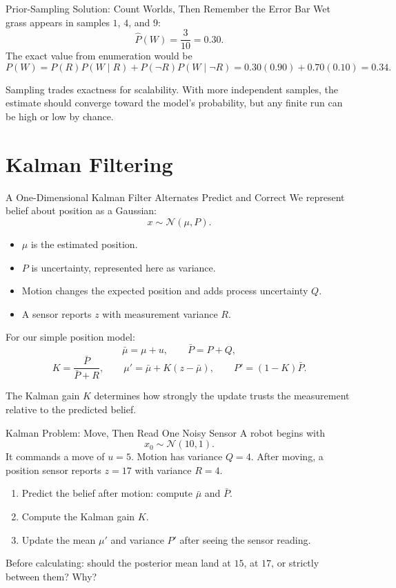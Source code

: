 \documentclass[aspectratio=169,10pt]{beamer}
\begin{document}
\begin{frame}{Prior-Sampling Solution: Count Worlds, Then Remember the Error Bar}
  Wet grass appears in samples $1$, $4$, and $9$:
  \[
    \widehat{P}(W)=\frac{3}{10}=0.30.
  \]
  The exact value from enumeration would be
  \[
    P(W)=P(R)P(W\mid R)+P(\neg R)P(W\mid\neg R)
         =0.30(0.90)+0.70(0.10)=0.34.
  \]
  \begin{keyidea}
    Sampling trades exactness for scalability. With more independent samples, the estimate should converge toward the model's probability, but any finite run can be high or low by chance.
  \end{keyidea}
\end{frame}

\section{Kalman Filtering}

\begin{frame}{A One-Dimensional Kalman Filter Alternates Predict and Correct}
  We represent belief about position as a Gaussian:
  \[
    x\sim\mathcal{N}(\mu,P).
  \]
  \begin{itemize}
    \item $\mu$ is the estimated position.
    \item $P$ is uncertainty, represented here as variance.
    \item Motion changes the expected position and adds process uncertainty $Q$.
    \item A sensor reports $z$ with measurement variance $R$.
  \end{itemize}
  For our simple position model:
  \[
    \bar\mu=\mu+u,\qquad \bar P=P+Q,
  \]
  \[
    K=\frac{\bar P}{\bar P+R},\qquad
    \mu'=\bar\mu+K(z-\bar\mu),\qquad
    P'=(1-K)\bar P.
  \]
  \begin{keyidea}
    The Kalman gain $K$ determines how strongly the update trusts the measurement relative to the predicted belief.
  \end{keyidea}
\end{frame}

\begin{frame}{Kalman Problem: Move, Then Read One Noisy Sensor}
  A robot begins with
  \[
    x_0\sim\mathcal{N}(10,1).
  \]
  It commands a move of $u=5$. Motion has variance $Q=4$.
  After moving, a position sensor reports $z=17$ with variance $R=4$.
  \begin{enumerate}
    \item Predict the belief after motion: compute $\bar\mu$ and $\bar P$.
    \item Compute the Kalman gain $K$.
    \item Update the mean $\mu'$ and variance $P'$ after seeing the sensor reading.
  \end{enumerate}
  \begin{activity}
    Before calculating: should the posterior mean land at $15$, at $17$, or strictly between them? Why?
  \end{activity}
\end{frame}
\end{document}
